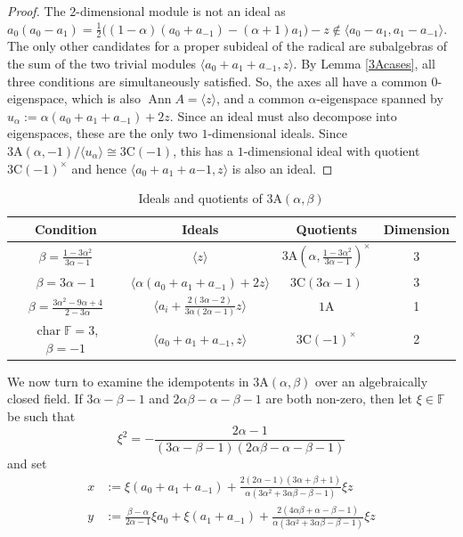 \documentclass[11pt, a4paper]{article}
\theoremstyle{plain}
\theoremstyle{definition}
\newcommand\al{\alpha}
\newcommand\bt{\beta}
\newcommand\la{\langle}
\newcommand\ra{\rangle}
\DeclareMathOperator{\ch}{char}
\DeclareMathOperator{\Ann}{Ann}
\newcommand\FF{\mathbb{F}}
\newcommand{\A}{\mathrm{A}}
\newcommand{\C}{\mathrm{C}}
\newcommand{\0}{\overline{0}}
\newcommand{\2}{\overline{2}}
\newcommand{\1}{\mathbbm{1}}
\newcommand{\rt}{\xi}
\begin{document}
\begin{proof}
The $2$-dimensional module is not an ideal as $a_0(a_0-a_1) = \frac{1}{2}\big( (1-\al) (a_0 + a_{-1}) - (\al+1) a_1\big) - z \notin \la a_0-a_1, a_1-a_{-1}\ra$.  The only other candidates for a proper subideal of the radical are subalgebras of the sum of the two trivial modules $\la a_0+a_1+a_{-1}, z \ra$.  By Lemma \ref{3Acases}, all three conditions are simultaneously satisfied.  So, the axes all have a common $0$-eigenspace, which is also $\Ann A = \la z \ra$, and a common $\al$-eigenspace spanned by $u_\al := \al(a_0+a_1+a_{-1}) + 2z$. Since an ideal must also decompose into eigenspaces, these are the only two $1$-dimensional ideals.  Since $3\A(\al, -1)/\la u_\al\ra \cong 3\C(-1)$, this has a $1$-dimensional ideal with quotient $3\C(-1)^\times$ and hence $\la a_0+a_1+a{-1}, z \ra$ is also an ideal.
\end{proof}

\begin{table}[h!tb]
\renewcommand{\arraystretch}{1.5}
\centering
\footnotesize
\begin{tabular}{c|c|c|c}
\hline
Condition & Ideals & Quotients & Dimension \\
\hline
 $\bt = \tfrac{1-3\al^2}{3\al-1}$ & $\la z \ra$  & $3\A(\al, \tfrac{1-3\al^2}{3\al-1})^\times$ & 3 \\
$\bt = 3\al-1$ & $\la \al(a_0+a_1+a_{-1}) +2z \ra$ & $3\C(3\al-1)$ & 3\\
$\bt = \tfrac{3\al^2-9\al+4}{2-3\al}$ & $\la a_i + \tfrac{2(3\al - 2)}{3\al(2\al-1)}z \ra$ & $1\A$ & 1 \\
$\ch \FF = 3$, $\bt=-1$ & $\la a_0+a_1+a_{-1}, z \ra$ &$ 3\C(-1)^\times$ & 2
\end{tabular}
\caption{Ideals and quotients of $3\A(\al, \bt)$}\label{tab:3Aprops}
\end{table}

We now turn to examine the idempotents in $3\A(\al,\bt)$ over an algebraically closed field.  If $3\al-\bt-1$ and $2\al\bt-\al-\bt-1$ are both non-zero, then let $\rt \in \FF$ be such that
\[
\rt^2 = -\frac{2\al-1}{(3\al-\bt-1)(2\al\bt-\al-\bt-1)}
\]
and set 
\begin{align*}
	x &:=  \rt(a_0+a_1+a_{-1}) + \frac{2(2\al - 1)(3\al + \bt + 1)}{\al(3\al^2 + 3\al\bt - \bt - 1)} \rt z\\
	y &:=  \frac{\bt-\al}{2\al-1}\rt a_0 + \rt(a_1+a_{-1}) + \frac{2(4\al\bt + \al - \bt - 1)}{\al(3\al^2 + 3\al\bt - \bt - 1)} \rt z
\end{align*}
\end{document}

